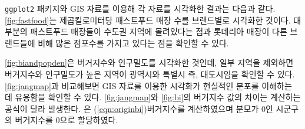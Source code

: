 \documentclass{scrartcl}
\begin{document}
\texttt{ggplot2} 패키지와 GIS 자료를 이용해 각 자료를 시각화한 결과는 다음과 같다. \autoref{fig:fastfood}는 제곱킬로미터당 패스트푸드 매장 수를 브랜드별로 시각화한 것이다. 대부분의 패스트푸드 매장들이 수도권 지역에 몰려있다는 점과 롯데리아 매장이 다른 브랜드들에 비해 많은 점포수를 가지고 있다는 점을 확인할 수 있다. 

\autoref{fig:biandpopden}은 버거지수와 인구밀도를 시각화한 것인데, 일부 지역을 제외하면 버거지수와 인구밀도가 높은 지역이 광역시와 특별시 즉, 대도시임을 확인할 수 있다. \autoref{fig:jangmap}과 비교해보면 GIS 자료를 이용한 시각화가 현실적인 분포를 이해하는 데 유용함을 확인할 수 있다. \autoref{fig:jangmap}와 \autoref{fig:bi}의 버거지수 값의 차이는 계산하는 공식이 달라 발생한다. \citet{jang2014}은 (\ref{eqn:originbi})\로 버거지수를 계산하였으며 분모가 0인 시군구의 버거지수를 0으로 할당하였다.
\end{document}
